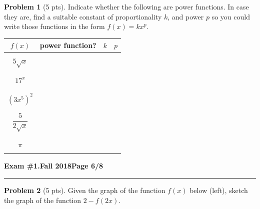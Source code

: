 \documentclass[12pt]{article}
\theoremstyle{definition}
\newtheorem{problem}{Problem}
\begin{document}
\begin{problem}[5 pts]
  Indicate whether the following are power functions. In case they are, find a suitable constant of proportionality $k$,
  and power $p$ so you could write those functions in the form $f(x) = kx^p$. 
  \begin{center}
    \begin{tabular}{|c|c|c|c|}
      \hline
      $f(x)$ & power function? & $k$ & $p$ \\
      \hline
      \hline
             &&& \\
      $5\sqrt{x}$ &&\hspace{1cm} & \hspace{1cm} \\
             &&& \\
      \hline
             &&& \\
      $17^x$ &&& \\
             &&& \\
      \hline
             &&& \\
      $(3x^5)^2$ &&& \\
             &&& \\
      \hline
             &&& \\
      $\dfrac{5}{2\sqrt{x}}$ &&& \\
             &&& \\
      \hline
             &&& \\
      $\pi$ &&& \\
             &&& \\
      \hline
    \end{tabular}
  \end{center}
\end{problem}
\newpage


\hfill{\large\bf Exam \#1.}\hfill{\large\bf  Fall 2018}\hfill{\large\bf Page 6/8}\hrule

\bigskip

\begin{problem}[5 pts]
  Given the graph of the function $f(x)$ below (left), sketch the graph of the function $2-f(2x)$. 
  \begin{center}
  \end{center}  
\end{problem}
\end{document}
